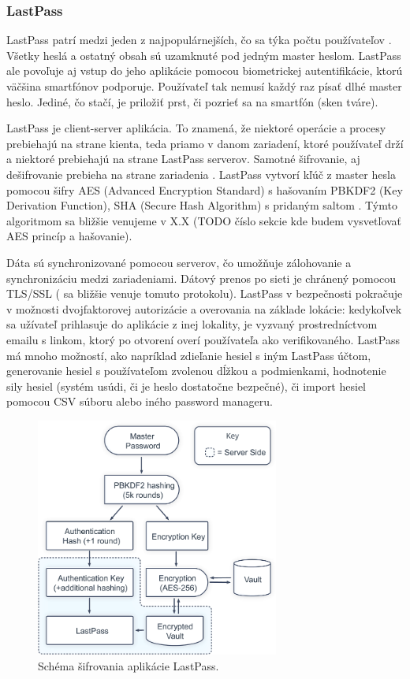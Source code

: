 \subsubsection{LastPass} 
LastPass patrí medzi jeden z najpopulárnejších, čo sa týka počtu používateľov \cite{11}. Všetky heslá a ostatný obsah sú uzamknuté pod jedným master heslom. LastPass ale povoľuje aj vstup do jeho aplikácie pomocou biometrickej autentifikácie, ktorú väčšina smartfónov podporuje. Používateľ tak nemusí každý raz písať dlhé master heslo. Jediné, čo stačí, je priložiť prst, či pozrieť sa na smartfón (sken tváre). 
\par LastPass je client-server aplikácia. To znamená, že niektoré operácie a procesy prebiehajú na strane kienta, teda priamo v danom zariadení, ktoré používateľ drží a niektoré prebiehajú na strane LastPass serverov. Samotné šifrovanie, aj dešifrovanie prebieha na strane zariadenia \cite{12}. LastPass vytvorí kľúč z master hesla pomocou šifry AES (Advanced Encryption Standard) s hašovaním PBKDF2 (Key Derivation Function), SHA (Secure Hash Algorithm) s pridaným saltom \cite{13}. Týmto algoritmom sa bližšie venujeme v X.X (TODO číslo sekcie kde budem vysvetľovať AES princíp a hašovanie).
\par Dáta sú synchronizované pomocou serverov, čo umožňuje zálohovanie a synchronizáciu medzi zariadeniami. Dátový prenos po sieti je chránený pomocou TLS/SSL (\cite{14} sa bližšie venuje tomuto protokolu). LastPass v bezpečnosti pokračuje v možnosti dvojfaktorovej autorizácie a overovania na základe lokácie: kedykoľvek sa užívateľ prihlasuje do aplikácie z inej lokality, je vyzvaný prostredníctvom emailu s linkom, ktorý po otvorení overí používateľa ako verifikovaného. LastPass má mnoho možností, ako napríklad zdieľanie hesiel s iným LastPass účtom, generovanie hesiel s používateľom zvolenou dĺžkou a podmienkami, hodnotenie sily hesiel (systém usúdi, či je heslo dostatočne bezpečné), či import hesiel pomocou CSV súboru alebo iného password manageru.
\newline
\begin{figure}[ht]
  \centering
  \includegraphics[width=8cm]{img/lastpass.png}
  \caption{Schéma šifrovania aplikácie LastPass.}
\end{figure}

